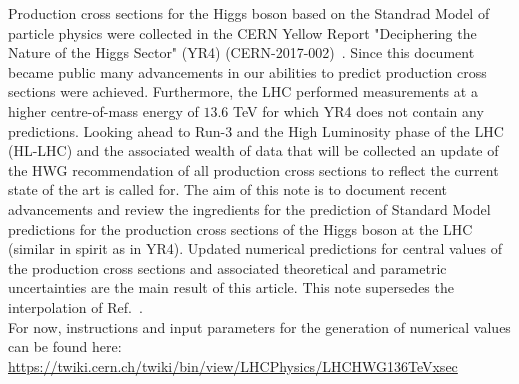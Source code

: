 \renewcommand*{\thefootnote}{\arabic{footnote}}
\setcounter{footnote}{0}
\setcounter{page}{1}
Production cross sections for the Higgs boson based on the Standrad Model of particle physics were collected in the CERN Yellow Report "Deciphering the Nature of the Higgs Sector" (YR4) (CERN-2017-002)~\cite{LHCHiggsCrossSectionWorkingGroup:2016ypw}.  
Since this document became public many advancements in our abilities to predict production cross sections were achieved. 
Furthermore, the LHC performed measurements at a higher centre-of-mass energy of $13.6$ TeV for which YR4 does not contain any predictions.
Looking ahead to Run-3 and the High Luminosity phase of the LHC  (HL-LHC) and the associated wealth of data that will be collected an update of the HWG recommendation of all production cross sections to reflect the current state of the art is called for.
The aim of this note is to document recent advancements and review the ingredients for the prediction of Standard Model predictions for the production cross sections of the Higgs boson at the LHC (similar in spirit as in YR4). 
Updated numerical predictions for central values of the production cross sections and associated theoretical and parametric uncertainties are the main result of this article. This note supersedes the interpolation of Ref.~\cite{Karlberg:2024zxx}.
\\
For now, instructions and input parameters for the generation of numerical values can be found here:  \url{https://twiki.cern.ch/twiki/bin/view/LHCPhysics/LHCHWG136TeVxsec}
